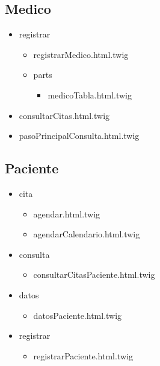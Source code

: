 		\subsection{Medico}
		\begin{itemize}
			\item registrar
			\begin{itemize}
			\item registrarMedico.html.twig
			\item parts
			\begin{itemize}
				\item medicoTabla.html.twig
			\end{itemize}
			\end{itemize}
			\item consultarCitas.html.twig
			\item pasoPrincipalConsulta.html.twig 
			
		\end{itemize}
		\subsection{Paciente}
		\begin{itemize}
			\item cita
			\begin{itemize}
				\item agendar.html.twig
				\item agendarCalendario.html.twig
			\end{itemize}

			\item consulta
			\begin{itemize}
				\item consultarCitasPaciente.html.twig
			\end{itemize}
			
			
			\item datos
			\begin{itemize}
			\item datosPaciente.html.twig
			\end{itemize}
			
			\item registrar
			\begin{itemize}
			\item registrarPaciente.html.twig
			\end{itemize}
			
		\end{itemize}
